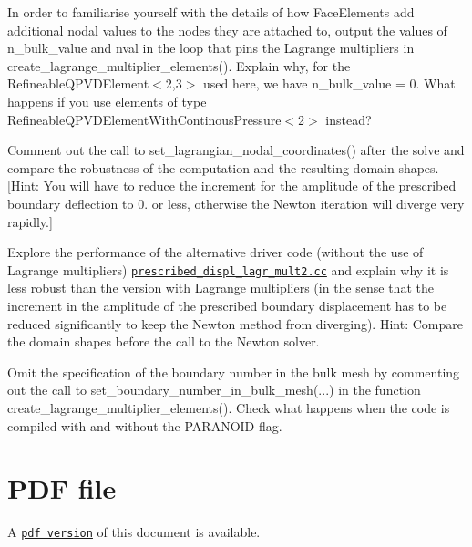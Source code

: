 \begin{DoxyEnumerate}
\item In order to familiarise yourself with the details of how {\ttfamily Face\+Elements} add additional nodal values to the nodes they are attached to, output the values of {\ttfamily n\+\_\+bulk\+\_\+value} and {\ttfamily nval} in the loop that pins the Lagrange multipliers in {\ttfamily create\+\_\+lagrange\+\_\+multiplier\+\_\+elements()}. Explain why, for the {\ttfamily Refineable\+Q\+P\+V\+D\+Element$<$2,3$>$} used here, we have {\ttfamily n\+\_\+bulk\+\_\+value} = 0. What happens if you use elements of type {\ttfamily Refineable\+Q\+P\+V\+D\+Element\+With\+Continous\+Pressure$<$2$>$} instead? ~\newline
~\newline

\item Comment out the call to {\ttfamily set\+\_\+lagrangian\+\_\+nodal\+\_\+coordinates()} after the solve and compare the robustness of the computation and the resulting domain shapes. \mbox{[}Hint\+: You will have to reduce the increment for the amplitude of the prescribed boundary deflection to 0. or less, otherwise the Newton iteration will diverge very rapidly.\mbox{]} ~\newline
~\newline

\item Explore the performance of the alternative driver code (without the use of Lagrange multipliers) \href{../../../../demo_drivers/solid/prescribed_displ_lagr_mult/prescribed_displ_lagr_mult2.cc}{\tt prescribed\+\_\+displ\+\_\+lagr\+\_\+mult2.\+cc} and explain why it is less robust than the version with Lagrange multipliers (in the sense that the increment in the amplitude of the prescribed boundary displacement has to be reduced significantly to keep the Newton method from diverging). Hint\+: Compare the domain shapes before the call to the Newton solver. ~\newline
~\newline

\item Omit the specification of the boundary number in the bulk mesh by commenting out the call to {\ttfamily set\+\_\+boundary\+\_\+number\+\_\+in\+\_\+bulk\+\_\+mesh}(...) in the function {\ttfamily create\+\_\+lagrange\+\_\+multiplier\+\_\+elements()}. Check what happens when the code is compiled with and without the {\ttfamily P\+A\+R\+A\+N\+O\+ID} flag.
\end{DoxyEnumerate}

 

 \hypertarget{index_pdf}{}\section{P\+D\+F file}\label{index_pdf}
A \href{../latex/refman.pdf}{\tt pdf version} of this document is available. 
